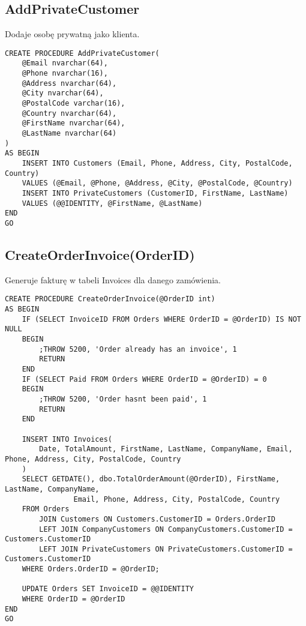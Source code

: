 \subsection{AddPrivateCustomer}
Dodaje osobę prywatną jako klienta.
\begin{verbatim}
CREATE PROCEDURE AddPrivateCustomer(
    @Email nvarchar(64),
    @Phone nvarchar(16),
    @Address nvarchar(64),
    @City nvarchar(64),
    @PostalCode varchar(16),
    @Country nvarchar(64),
    @FirstName nvarchar(64),
    @LastName nvarchar(64)
)
AS BEGIN
    INSERT INTO Customers (Email, Phone, Address, City, PostalCode, Country)
    VALUES (@Email, @Phone, @Address, @City, @PostalCode, @Country)
    INSERT INTO PrivateCustomers (CustomerID, FirstName, LastName) 
    VALUES (@@IDENTITY, @FirstName, @LastName)
END
GO
\end{verbatim}
\subsection{CreateOrderInvoice(OrderID)}
Generuje fakturę w tabeli Invoices dla danego zamówienia.
\begin{verbatim}
CREATE PROCEDURE CreateOrderInvoice(@OrderID int)
AS BEGIN
    IF (SELECT InvoiceID FROM Orders WHERE OrderID = @OrderID) IS NOT NULL
    BEGIN
        ;THROW 5200, 'Order already has an invoice', 1
        RETURN
    END
    IF (SELECT Paid FROM Orders WHERE OrderID = @OrderID) = 0
    BEGIN
        ;THROW 5200, 'Order hasnt been paid', 1
        RETURN
    END

    INSERT INTO Invoices(
        Date, TotalAmount, FirstName, LastName, CompanyName, Email, Phone, Address, City, PostalCode, Country
    )
    SELECT GETDATE(), dbo.TotalOrderAmount(@OrderID), FirstName, LastName, CompanyName, 
                Email, Phone, Address, City, PostalCode, Country 
    FROM Orders
        JOIN Customers ON Customers.CustomerID = Orders.OrderID
        LEFT JOIN CompanyCustomers ON CompanyCustomers.CustomerID = Customers.CustomerID
        LEFT JOIN PrivateCustomers ON PrivateCustomers.CustomerID = Customers.CustomerID
    WHERE Orders.OrderID = @OrderID;

    UPDATE Orders SET InvoiceID = @@IDENTITY
    WHERE OrderID = @OrderID
END
GO
\end{verbatim}
